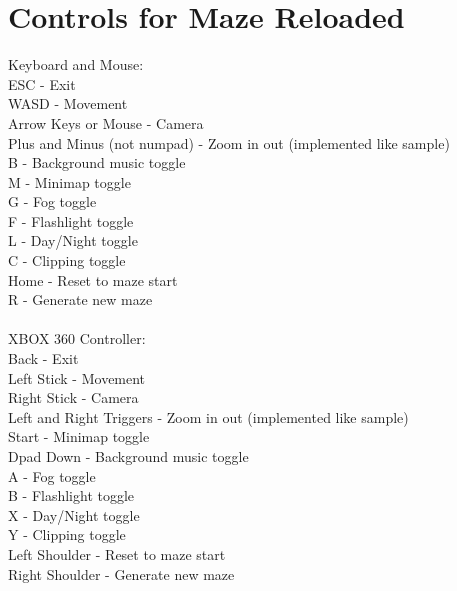 \documentclass[titlepage]{article}
\begin{document}
\section{Controls for Maze Reloaded}
Keyboard and Mouse: \\
ESC - Exit \\
WASD - Movement \\
Arrow Keys or Mouse - Camera \\
Plus and Minus (not numpad) - Zoom in out (implemented like sample) \\
B - Background music toggle \\
M - Minimap toggle \\
G - Fog toggle \\
F - Flashlight toggle \\
L - Day/Night toggle \\
C - Clipping toggle \\
Home - Reset to maze start \\
R - Generate new maze \\
\\
XBOX 360 Controller: \\
Back - Exit \\
Left Stick - Movement \\
Right Stick - Camera \\
Left and Right Triggers - Zoom in out (implemented like sample) \\
Start - Minimap toggle \\
Dpad Down - Background music toggle \\
A - Fog toggle \\
B - Flashlight toggle \\
X - Day/Night toggle \\
Y - Clipping toggle \\
Left Shoulder - Reset to maze start \\
Right Shoulder - Generate new maze \\
\end{document}

